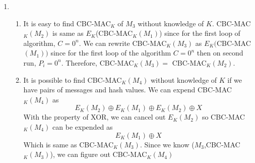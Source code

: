 \documentclass[11pt]{article}
\theoremstyle{definition}
\begin{document}
\begin{enumerate}
\begin{enumerate}
		\item %
		
		\begin{enumerate}
		
			\item %
				It is easy to find CBC-MAC$_K$ of $M_3$ without knowledge of $K$. CBC-MAC$_K (M_2)$ is same as $E_K$(CBC-MAC$_K (M_1)$) since for the first loop of algorithm, $C = 0^n$. We can rewrite CBC-MAC$_K (M_3)$ as $E_K($CBC-MAC$(M_1))$ since for the first loop of the algorithm $C = 0^n$ then on second run, $P_i = 0^n$. Therefore, CBC-MAC$_K(M_3) = $  CBC-MAC$_K(M_2)$.
			\item %
				It is possible to find CBC-MAC$_K(M_4)$ without knowledge of $K$ if we have pairs of messages and hash values. We can expend CBC-MAC$_K(M_4)$ as 
				\[E_K(M_2) \oplus E_K(M_1) \oplus E_K(M_2) \oplus X \]
				With the property of XOR, we can cancel out $E_K(M_2)$ so CBC-MAC$_K(M_4)$ can be expended as
				\[E_K(M_1) \oplus X\]
				Which is same as CBC-MAC$_K(M_3)$. Since we know ($M_3$,CBC-MAC$_K(M_3)$), we can figure out CBC-MAC$_K(M_4)$
		\end{enumerate}
	\end{enumerate}
	
	
	
	

\end{enumerate}
\end{document}
